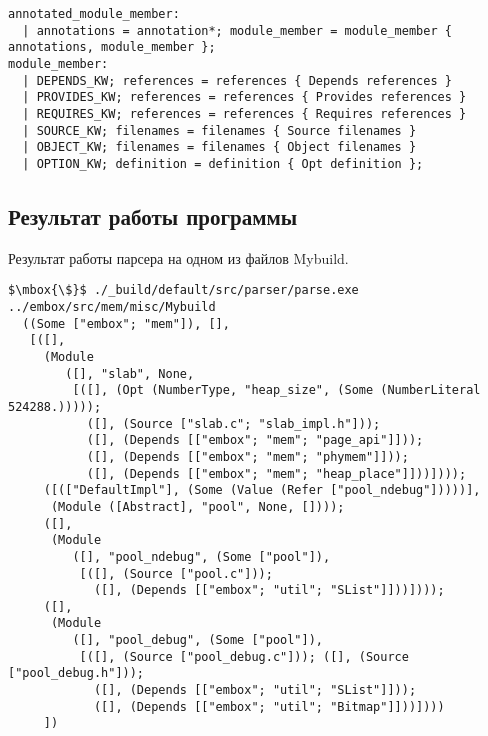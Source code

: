 \begin{lstlisting}[caption=Пример описания правил в \href{https://github.com/mikhaylovilya/caravan/blob/master/src/parser/parser.mly\#L126C1-L134C61}{parser.mly}, language=caml, frame=single, breaklines]
annotated_module_member:
  | annotations = annotation*; module_member = module_member { annotations, module_member };
module_member:
  | DEPENDS_KW; references = references { Depends references }
  | PROVIDES_KW; references = references { Provides references }
  | REQUIRES_KW; references = references { Requires references }
  | SOURCE_KW; filenames = filenames { Source filenames }
  | OBJECT_KW; filenames = filenames { Object filenames }
  | OPTION_KW; definition = definition { Opt definition };
\end{lstlisting}

\subsection{Результат работы программы}
Результат работы парсера на одном из файлов Mybuild.

\begin{lstlisting}[language=caml, frame=single, breaklines]
  $\mbox{\$}$ ./_build/default/src/parser/parse.exe ../embox/src/mem/misc/Mybuild
  ((Some ["embox"; "mem"]), [],
   [([],
     (Module
        ([], "slab", None,
         [([], (Opt (NumberType, "heap_size", (Some (NumberLiteral 524288.)))));
           ([], (Source ["slab.c"; "slab_impl.h"]));
           ([], (Depends [["embox"; "mem"; "page_api"]]));
           ([], (Depends [["embox"; "mem"; "phymem"]]));
           ([], (Depends [["embox"; "mem"; "heap_place"]]))])));
     ([(["DefaultImpl"], (Some (Value (Refer ["pool_ndebug"]))))],
      (Module ([Abstract], "pool", None, [])));
     ([],
      (Module
         ([], "pool_ndebug", (Some ["pool"]),
          [([], (Source ["pool.c"]));
            ([], (Depends [["embox"; "util"; "SList"]]))])));
     ([],
      (Module
         ([], "pool_debug", (Some ["pool"]),
          [([], (Source ["pool_debug.c"])); ([], (Source ["pool_debug.h"]));
            ([], (Depends [["embox"; "util"; "SList"]]));
            ([], (Depends [["embox"; "util"; "Bitmap"]]))])))
     ])
\end{lstlisting}

